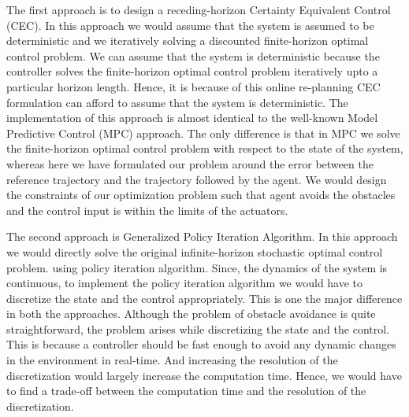 \documentclass[conference]{IEEEtran}
\begin{document}
The first approach is to design a receding-horizon Certainty Equivalent Control (CEC). In this approach we would assume that the system is assumed to be deterministic
and we iteratively solving a discounted finite-horizon optimal control problem. We can assume that the system is deterministic 
because the controller solves the finite-horizon optimal control problem iteratively upto a particular horizon length. Hence, it is 
because of this online re-planning CEC formulation can afford to assume that the system is deterministic. The implementation of this approach is 
almost identical to the well-known Model Predictive Control (MPC) approach. The only difference is that in MPC we solve the finite-horizon optimal control problem
with respect to the state of the system, whereas here we have formulated our problem around the error between the reference trajectory and the trajectory followed by the agent.
We would design the constraints of our optimization problem such that agent avoids the obstacles and the control input is within the limits of the actuators.

The second approach is Generalized Policy Iteration Algorithm. In this approach we would directly solve the original infinite-horizon stochastic optimal control problem.
using policy iteration algorithm. Since, the dynamics of the system is continuous, to implement the policy iteration 
algorithm we would have to discretize the state and the control appropriately. This is one the major difference in both the approaches. Although 
the problem of obstacle avoidance is quite straightforward, the problem arises while discretizing the state and the control. This is because a
controller should be fast enough to avoid any dynamic changes in the environment in real-time. And increasing the resolution of the discretization 
would largely increase the computation time. Hence, we would have to find a trade-off between the computation time and the resolution of the discretization.
\end{document}
